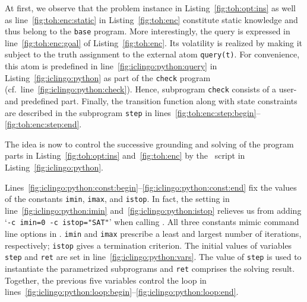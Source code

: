 At first, we observe that
the problem instance in Listing~\ref{fig:toh:opt:ins} as well as line~\ref{fig:toh:enc:static} in Listing~\ref{fig:toh:enc} 
constitute static knowledge and thus belong to the \lstinline{base} program.
%
More interestingly, the query is expressed in line~\ref{fig:toh:enc:goal} of Listing~\ref{fig:toh:enc}.
Its volatility is realized by making it subject to the truth assignment to the external atom \lstinline{query(t)}.
For convenience,
this atom is predefined in line~\ref{fig:iclingo:python:query} in Listing~\ref{fig:iclingo:python} as part of the \lstinline{check} program (cf.~line~\ref{fig:iclingo:python:check}).
Hence, subprogram \lstinline{check} consists of a user- and predefined part.
%
Finally,
the transition function along with state constraints are described in the subprogram \lstinline{step} in lines~\ref{fig:toh:enc:step:begin}--\ref{fig:toh:enc:step:end}.

The idea is now to control the successive grounding and solving of the program parts in Listing~\ref{fig:toh:opt:ins} and~\ref{fig:toh:enc}
by the \python\ script in Listing~\ref{fig:iclingo:python}.
%

%
Lines~\ref{fig:iclingo:python:const:begin}--\ref{fig:iclingo:python:const:end} fix the values of the constants \lstinline{imin}, \lstinline{imax}, and \lstinline{istop}.
In fact, the setting in line~\ref{fig:iclingo:python:imin} and~\ref{fig:iclingo:python:istop} relieves us from adding
`\lstinline{-c imin=0 -c istop="SAT"}'
when calling \clingo.
All three constants mimic command line options in \iclingo.
\lstinline{imin} and \lstinline{imax} prescribe a least and largest number of iterations, respectively;
\lstinline{istop} gives a termination criterion.
The initial values of variables \lstinline{step} and \lstinline{ret} are set in line~\ref{fig:iclingo:python:vars}.
The value of \lstinline{step} is used to instantiate the parametrized subprograms
and \lstinline{ret} comprises the solving result.
Together, the previous five variables control the loop in lines~\ref{fig:iclingo:python:loop:begin}--\ref{fig:iclingo:python:loop:end}.

